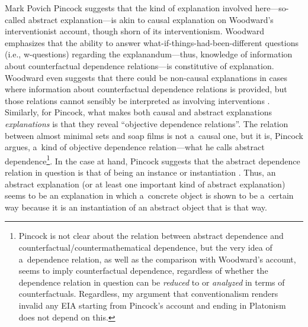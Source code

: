 \begin{artengenv}{Mark Povich}
Pincock suggests that the kind of explanation involved here---so-called abstract explanation---is akin to causal explanation on Woodward's
\parencite*[][]{woodward_making_2003} %
 interventionist account, though shorn of its interventionism. Woodward emphasizes that the ability to answer what-if-things-had-been-different questions (i.e., w-questions) regarding the explanandum---thus, knowledge of information about counterfactual dependence relations---is constitutive of explanation. Woodward even suggests that there could be non-causal explanations in cases where information about counterfactual dependence relations is provided, but those relations cannot sensibly be interpreted as involving interventions 
\parencite[][p.221]{woodward_making_2003}. %
 Similarly, for Pincock, what makes both causal and abstract explanations \textit{explanations} is that they reveal ``objective dependence relations''. The relation between almost minimal sets and soap films is not a~causal one, but it is, Pincock argues, a~kind of objective dependence relation---what he calls abstract dependence\footnote{Pincock is not clear about the relation between abstract dependence and counterfactual/countermathematical dependence, but the very idea of a~dependence relation, as well as the comparison with Woodward's account, seems to imply counterfactual dependence, regardless of whether the dependence relation in question can be \textit{reduced} to or \textit{analyzed} in terms of counterfactuals. Regardless, my argument that conventionalism renders invalid any EIA starting from Pincock's account and ending in Platonism does not depend on this.}. In the case at hand, Pincock suggests that the abstract dependence relation in question is that of being an instance or instantiation 
\parencite[][p.865]{pincock_abstract_2015}. %
 Thus, an abstract explanation (or at least one important kind of abstract explanation) seems to be an explanation in which a~concrete object is shown to be a~certain way because it is an instantiation of an abstract object that is that way.


\end{artengenv}
